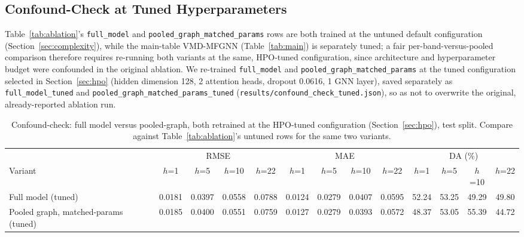 \documentclass[journal]{IEEEtran}
\begin{document}
\subsection{Confound-Check at Tuned Hyperparameters}
\label{sec:confound-tuned}

Table~\ref{tab:ablation}'s \texttt{full\_model} and \texttt{pooled\_graph\_matched\_params} rows are both trained at the untuned default configuration (Section~\ref{sec:complexity}), while the main-table VMD-MFGNN (Table~\ref{tab:main}) is separately tuned; a fair per-band-versus-pooled comparison therefore requires re-running both variants at the same, HPO-tuned configuration, since architecture and hyperparameter budget were confounded in the original ablation. We re-trained \texttt{full\_model} and \texttt{pooled\_graph\_matched\_params} at the tuned configuration selected in Section~\ref{sec:hpo} (hidden dimension 128, 2 attention heads, dropout 0.0616, 1 GNN layer), saved separately as \texttt{full\_model\_tuned} and \texttt{pooled\_graph\_matched\_params\_tuned} (\texttt{results/confound\_check\_tuned.json}), so as not to overwrite the original, already-reported ablation run.

\begin{table}[!t]
\centering
\caption{Confound-check: full model versus pooled-graph, both retrained at the HPO-tuned configuration (Section~\ref{sec:hpo}), test split. Compare against Table~\ref{tab:ablation}'s untuned rows for the same two variants.}
\label{tab:confound-tuned}
\begin{tabular}{l cccc cccc cccc}
\toprule
& \multicolumn{4}{c}{RMSE} & \multicolumn{4}{c}{MAE} & \multicolumn{4}{c}{DA (\%)} \\
\cmidrule(lr){2-5} \cmidrule(lr){6-9} \cmidrule(lr){10-13}
Variant & $h$=1 & $h$=5 & $h$=10 & $h$=22 & $h$=1 & $h$=5 & $h$=10 & $h$=22 & $h$=1 & $h$=5 & $h$=10 & $h$=22 \\
\midrule
Full model (tuned) & 0.0181 & 0.0397 & 0.0558 & 0.0788 & 0.0124 & 0.0279 & 0.0407 & 0.0595 & 52.24 & 53.25 & 49.29 & 49.80 \\
Pooled graph, matched-params (tuned) & 0.0185 & 0.0400 & 0.0551 & 0.0759 & 0.0127 & 0.0279 & 0.0393 & 0.0572 & 48.37 & 53.05 & 55.39 & 44.72 \\
\bottomrule
\end{tabular}
\end{table}
\end{document}
